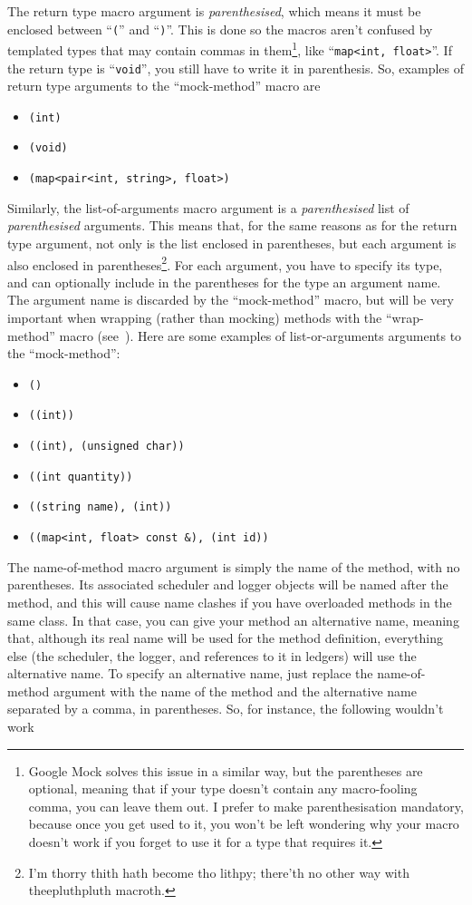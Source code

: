 \documentclass[twoside, a4paper, article]{memoir}
\begin{document}
The return type macro argument is \emph{parenthesised}, which means it must be
enclosed between ``\texttt{(}'' and ``\texttt{)}''.  This is done so the macros
aren't confused by templated types that may contain commas in
them\footnote{Google Mock solves this issue in a similar way, but the
  parentheses are optional, meaning that if your type doesn't contain any
  macro-fooling comma, you can leave them out.  I prefer to make
  parenthesisation mandatory, because once you get used to it, you won't be
  left wondering why your macro doesn't work if you forget to use it for a type
  that requires it.}, like ``\texttt{map<int, float>}''.  If the return type is
``\texttt{void}'', you still have to write it in parenthesis.  So, examples of
return type arguments to the ``mock-method'' macro are
\begin{itemize}
\item \texttt{(int)}
\item \texttt{(void)}
\item \texttt{(map<pair<int, string>, float>)}
\end{itemize}

Similarly, the list-of-arguments macro argument is a \emph{parenthesised} list
of \emph{parenthesised} arguments.  This means that, for the same reasons as
for the return type argument, not only is the list enclosed in parentheses, but
each argument is also enclosed in parentheses\footnote{I'm thorry thith hath
  become tho lithpy; there'th no other way with theepluthpluth macroth.}.  For
each argument, you have to specify its type, and can optionally include in the
parentheses for the type an argument name.  The argument name is discarded by
the ``mock-method'' macro, but will be very important when wrapping (rather
than mocking) methods with the ``wrap-method'' macro
(see~).  Here are some examples of list-or-arguments
arguments to the ``mock-method'':
\begin{itemize}
\item \texttt{()}
\item \texttt{((int))}
\item \texttt{((int), (unsigned char))}
\item \texttt{((int quantity))}
\item \texttt{((string name), (int))}
\item \texttt{((map<int, float> const \&), (int id))}
\end{itemize}

The name-of-method macro argument is simply the name of the method, with no
parentheses.  Its associated scheduler and logger objects will be named after
the method, and this will cause name clashes if you have overloaded methods in
the same class.  In that case, you can give your method an alternative name,
meaning that, although its real name will be used for the method definition,
everything else (the scheduler, the logger, and references to it in ledgers)
will use the alternative name.  To specify an alternative name, just replace
the name-of-method argument with the name of the method and the alternative
name separated by a comma, in parentheses.  So, for instance, the following
wouldn't work
\end{document}
